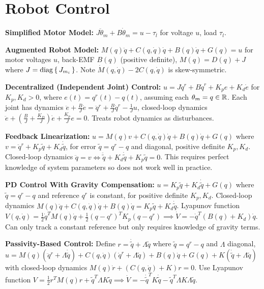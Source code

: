 \documentclass[twocolumn, 8pt]{extarticle}
\begin{document}
\section{Robot Control}

\textbf{Simplified Motor Model:} \(J\ddot\theta _m + B\dot\theta _m = u - \tau _l\) for voltage \(u\), load \(\tau _l\).

\textbf{Augmented Robot Model:} \(M(q)\ddot q + C(q, \dot q)\dot q + B(q)\dot q + G(q) = u\) for motor voltages \(u\),
back-EMF \(B(q)\) (positive definite), \(M(q) = D(q) + J\) where \(J = \operatorname{diag}\set{J_{m_i}}\).
Note \(\dot M(q, \dot q) - 2C(q, \dot q)\) is skew-symmetric.

\textbf{Decentralized (Independent Joint) Control:} \(u = J\ddot q^r + B\dot q^r + K_pe + K_d\dot e\) for \(K_p, K_d >
0\), where \(e(t) = q^r(t) - q(t)\), assuming each \(\theta _m = q \in \mathbb{R}\).
Each joint has dynamics \(\ddot e + \frac{B}{J}\dot e = \ddot q^r + \frac{B}{J}\dot q^r - \frac{1}{J}u\), closed-loop
dynamics \(\ddot e + \left(\frac{B}{J} + \frac{K_D}{J}\right)\dot e + \frac{K_p}{J}e = 0\).
Treats robot dynamics as disturbances.

\textbf{Feedback Linearization:} \(u = M(q)v + C(q, \dot q)\dot q + B(q)\dot q + G(q)\) where
\(v = \ddot q^r + K_p\tilde q + K_d\dot{\tilde q}\), for error \(\tilde q = q^r - q\) and diagonal, positive definite
\(K_p, K_d\). Closed-loop dynamics \(\ddot q = v \iff \ddot{\tilde q} + K_d\dot{\tilde q} + K_p\tilde q = 0\).
This requires perfect knowledge of system parameters so does not work well in practice.

\textbf{PD Control With Gravity Compensation:} \(u = K_p\tilde q + K_d\dot{\tilde q} + G(q)\) where \(\tilde q = q^r - q\)
and reference \(q^r\) is constant, for positive definite \(K_p, K_d\).
Closed-loop dynamics \(M(q)\ddot q + C(q, \dot q)\dot q + B(q)\dot q = K_p\tilde q + K_d\dot{\tilde q}\).
Lyapunov function
\( V(q, \dot q) = \frac{1}{2}\dot q^TM(q)\dot q + \frac{1}{2}(q - q^r)^TK_p(q - q^r) \implies \dot V = -\dot q^T(B(q) + K_d)\dot q\).
Can only track a constant reference but only requires knowledge of gravity terms.

\textbf{Passivity-Based Control:} Define \(r = \dot{\tilde q} + \Lambda\tilde q\) where \(\tilde q = q^r - q\) and
\(\Lambda\) diagonal,
\(u = M(q)(\ddot q^r + \Lambda\dot{\tilde q}) + C(q, \dot q)(\dot q^r + \Lambda\tilde q) + B(q)\dot q + G(q) + K(\dot{\tilde q} + \Lambda\tilde q)\)
with closed-loop dynamics \(M(q)\dot r + (C(q, \dot q) + K)r = 0\).
Use Lyapunov function \( V = \frac{1}{2}r^TM(q)r + \tilde q^T\Lambda K\tilde q \implies \dot V = -\dot{\tilde q}^TK\dot{\tilde q} - \tilde q^T\Lambda K\Lambda\tilde q\).
\end{document}
